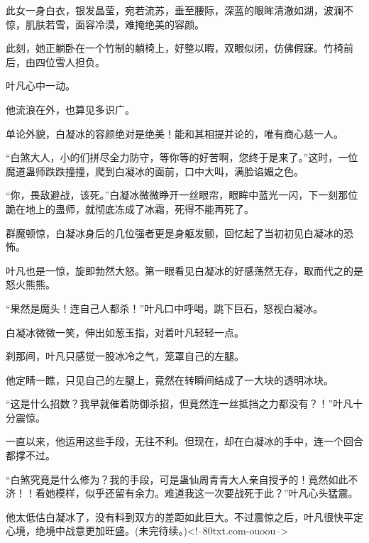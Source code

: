 \begin{this_body}
此女一身白衣，银发晶莹，宛若流苏，垂至腰际，深蓝的眼眸清澈如湖，波澜不惊，肌肤若雪，面容冷漠，难掩绝美的容颜。

此刻，她正躺卧在一个竹制的躺椅上，好整以暇，双眼似闭，仿佛假寐。竹椅前后，由四位雪人担负。

叶凡心中一动。

他流浪在外，也算见多识广。

单论外貌，白凝冰的容颜绝对是绝美！能和其相提并论的，唯有商心慈一人。

“白煞大人，小的们拼尽全力防守，等你等的好苦啊，您终于是来了。”这时，一位魔道蛊师跌跌撞撞，爬到白凝冰的面前，口中大叫，满脸谄媚之色。

“你，畏敌避战，该死。”白凝冰微微睁开一丝眼帘，眼眸中蓝光一闪，下一刻那位跪在地上的蛊师，就彻底冻成了冰霜，死得不能再死了。

群魔顿惊，白凝冰身后的几位强者更是身躯发颤，回忆起了当初初见白凝冰的恐怖。

叶凡也是一惊，旋即勃然大怒。第一眼看见白凝冰的好感荡然无存，取而代之的是怒火熊熊。

“果然是魔头！连自己人都杀！”叶凡口中呼喝，跳下巨石，怒视白凝冰。

白凝冰微微一笑，伸出如葱玉指，对着叶凡轻轻一点。

刹那间，叶凡只感觉一股冰冷之气，笼罩自己的左腿。

他定睛一瞧，只见自己的左腿上，竟然在转瞬间结成了一大块的透明冰块。

“这是什么招数？我早就催着防御杀招，但竟然连一丝抵挡之力都没有？！”叶凡十分震惊。

一直以来，他运用这些手段，无往不利。但现在，却在白凝冰的手中，连一个回合都撑不过。

“白煞究竟是什么修为？我的手段，可是蛊仙周青青大人亲自授予的！竟然如此不济！！看她模样，似乎还留有余力。难道我这一次要战死于此？”叶凡心头猛震。

他太低估白凝冰了，没有料到双方的差距如此巨大。不过震惊之后，叶凡很快平定心境，绝境中战意更加旺盛。(未完待续。)<!--80txt.com-ouoou-->

\end{this_body}

